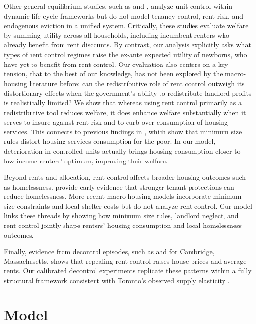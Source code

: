 \documentclass[parskip=full]{article}
\begin{document}
Other general equilibrium studies, such as \citet{eric-1995} and \citet{fmn-2023}, analyze unit control within dynamic life-cycle frameworks but do not model tenancy control, rent risk, and endogenous eviction in a unified system. Critically, these studies evaluate welfare by summing utility across all households, including incumbent renters who already benefit from rent discounts. By contrast, our analysis explicitly asks what types of rent control regimes raise the ex-ante expected utility of newborns, who have yet to benefit from rent control. Our evaluation also centers on a key tension, that to the best of our knowledge, has not been explored by the macro-housing literature before: can the redistributive role of rent control outweigh its distortionary effects when the government's ability to redistribute landlord profits is realistically limited? We show that whereas using rent control primarily as a redistributive tool reduces welfare, it does enhance welfare substantially when it serves to insure against rent risk and to curb over-consumption of housing services. This connects to previous findings in \citet{rs-2023}, which show that minimum size rules distort housing services consumption for the poor. In our model, deterioration in controlled units actually brings housing consumption closer to low-income renters’ optimum, improving their welfare.

Beyond rents and allocation, rent control affects broader housing outcomes such as homelessness. \citet{eo-1998} provide early evidence that stronger tenant protections can reduce homelessness. More recent macro-housing models \citep{az-2024, abramson-2024} incorporate minimum size constraints and local shelter costs but do not analyze rent control. Our model links these threads by showing how minimum size rules, landlord neglect, and rent control jointly shape renters’ housing consumption and local homelessness outcomes.

Finally, evidence from decontrol episodes, such as \citet{sims-2007} and \citet{app-2014} for Cambridge, Massachusetts, shows that repealing rent control raises house prices and average rents. Our calibrated decontrol experiments replicate these patterns within a fully structural framework consistent with Toronto’s observed supply elasticity \citep{piaxao-2021, rs-2023}.

\section{Model}\label{sec:model}
\end{document}
